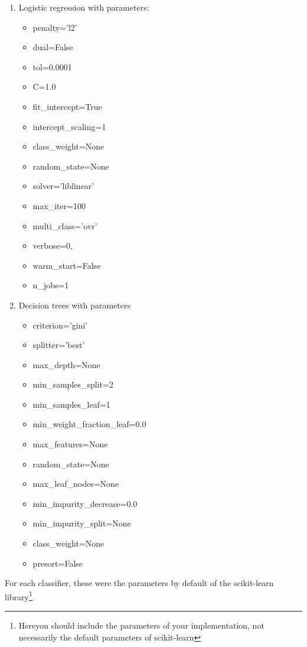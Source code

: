 \documentclass{article} %
\begin{document}
\begin{enumerate}
    \item Logistic regression with parameters:
       \begin{itemize}
           \item penalty=’l2’
           \item dual=False
           \item tol=0.0001
           \item  C=1.0
           \item fit\_intercept=True
           \item intercept\_scaling=1
           \item class\_weight=None
           \item random\_state=None
          \item  solver=’liblinear’
          \item  max\_iter=100
          \item  multi\_class=’ovr’
          \item verbose=0, 
          \item warm\_start=False 
          \item  n\_jobs=1
       \end{itemize}
    \item Decision trees with parameters
      \begin{itemize}
           \item criterion=’gini’
           \item splitter=’best’ 
           \item max\_depth=None 
           \item min\_samples\_split=2
           \item min\_samples\_leaf=1 
           \item min\_weight\_fraction\_leaf=0.0 
           \item max\_features=None 
           \item random\_state=None 
           \item max\_leaf\_nodes=None 
          \item min\_impurity\_decrease=0.0 
          \item min\_impurity\_split=None 
          \item class\_weight=None 
          \item presort=False
       \end{itemize}
   \end{enumerate}

For each classifier, these were the parameters by default of the scikit-learn library\footnote{Hereyou should include the parameters of your implementation, not necessarily the default parameters of scikit-learn}. 
 
\end{document}
